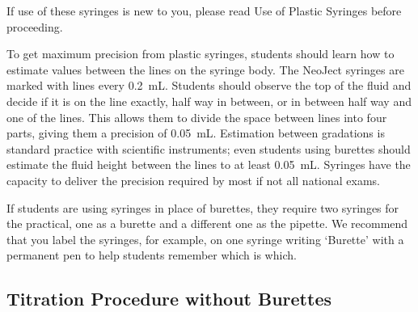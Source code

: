 If use of these syringes is new to you, please read Use of Plastic Syringes before proceeding.

To get maximum precision from plastic syringes, students should learn how to estimate values between the lines on the syringe body. The NeoJect syringes are marked with lines every 0.2~mL. Students should observe the top of the fluid and decide if it is on the line exactly, half way in between, or in between half way and one of the lines. This allows them to divide the space between lines into four parts, giving them a precision of 0.05~mL. Estimation between gradations is standard practice with scientific instruments; even students using burettes should estimate the fluid height between the lines to at least 0.05~mL. Syringes have the capacity to deliver the precision required by most if not all national exams.

If students are using syringes in place of burettes, they require two syringes for the practical, one as a burette and a different one as the pipette. We recommend that you label the syringes, for example, on one syringe writing ‘Burette’ with a permanent pen to help students remember which is which.

\subsection{Titration Procedure without Burettes}

